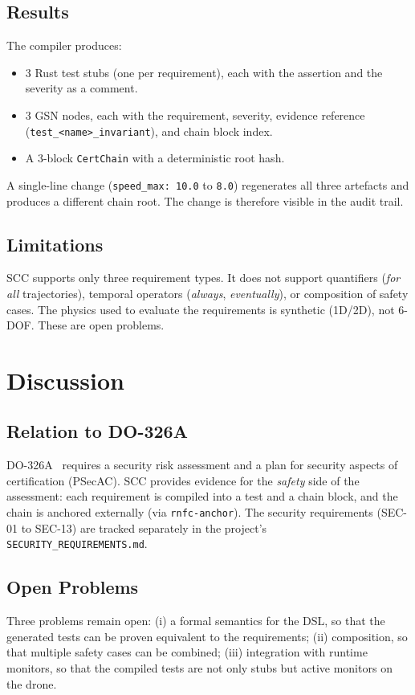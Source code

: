 \subsection{Results}
The compiler produces:
\begin{itemize}
    \item 3 Rust test stubs (one per requirement), each with the
          assertion and the severity as a comment.
    \item 3 GSN nodes, each with the requirement, severity,
          evidence reference (\texttt{test\_<name>\_invariant}), and
          chain block index.
    \item A 3-block \texttt{CertChain} with a deterministic root hash.
\end{itemize}
A single-line change (\texttt{speed\_max: 10.0} to \texttt{8.0})
regenerates all three artefacts and produces a different chain root.
The change is therefore visible in the audit trail.

\subsection{Limitations}
SCC supports only three requirement types. It does not support
quantifiers (\emph{for all} trajectories), temporal operators
(\emph{always}, \emph{eventually}), or composition of safety cases.
The physics used to evaluate the requirements is synthetic (1D/2D),
not 6-DOF. These are open problems.

\section{Discussion}

\subsection{Relation to DO-326A}
DO-326A~\cite{do326a} requires a security risk assessment and a
plan for security aspects of certification (PSecAC). SCC provides
evidence for the \emph{safety} side of the assessment: each
requirement is compiled into a test and a chain block, and the
chain is anchored externally (via \texttt{rnfc-anchor}). The
security requirements (SEC-01 to SEC-13) are tracked separately in
the project's \texttt{SECURITY\_REQUIREMENTS.md}.

\subsection{Open Problems}
Three problems remain open: (i) a formal semantics for the DSL, so
that the generated tests can be proven equivalent to the
requirements; (ii) composition, so that multiple safety cases can
be combined; (iii) integration with runtime monitors, so that the
compiled tests are not only stubs but active monitors on the drone.

